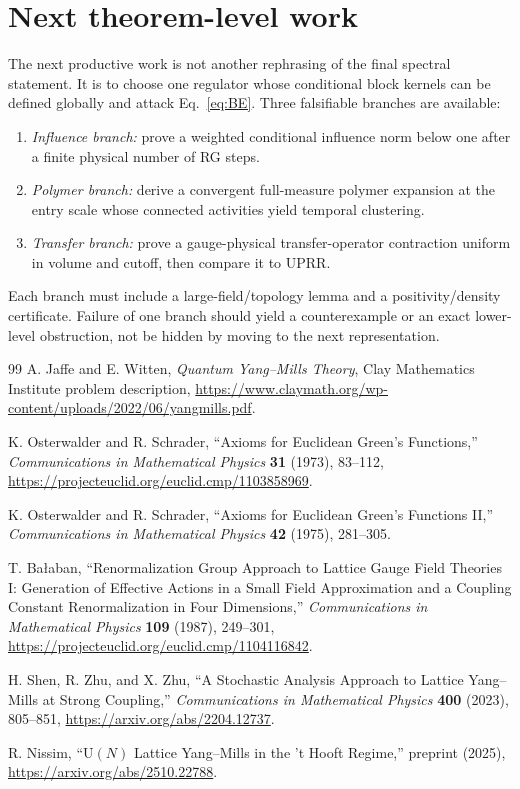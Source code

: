 \documentclass[11pt]{article}
\theoremstyle{remark}
\begin{document}
\section{Next theorem-level work}

The next productive work is not another rephrasing of the final spectral
statement.  It is to choose one regulator whose conditional block kernels can
be defined globally and attack Eq.~\eqref{eq:BE}.  Three falsifiable branches
are available:
\begin{enumerate}
\item \emph{Influence branch:} prove a weighted conditional influence norm
      below one after a finite physical number of RG steps.
\item \emph{Polymer branch:} derive a convergent full-measure polymer expansion
      at the entry scale whose connected activities yield temporal clustering.
\item \emph{Transfer branch:} prove a gauge-physical transfer-operator
      contraction uniform in volume and cutoff, then compare it to UPRR.
\end{enumerate}
Each branch must include a large-field/topology lemma and a positivity/density
certificate.  Failure of one branch should yield a counterexample or an exact
lower-level obstruction, not be hidden by moving to the next representation.

\begin{thebibliography}{99}
A. Jaffe and E. Witten,
\emph{Quantum Yang--Mills Theory}, Clay Mathematics Institute problem
description,\newline
\url{https://www.claymath.org/wp-content/uploads/2022/06/yangmills.pdf}.

K. Osterwalder and R. Schrader,
``Axioms for Euclidean Green's Functions,''
\emph{Communications in Mathematical Physics} \textbf{31} (1973), 83--112,\newline
\url{https://projecteuclid.org/euclid.cmp/1103858969}.

K. Osterwalder and R. Schrader,
``Axioms for Euclidean Green's Functions II,''
\emph{Communications in Mathematical Physics} \textbf{42} (1975), 281--305.

T. Ba\l aban,
``Renormalization Group Approach to Lattice Gauge Field Theories I:
Generation of Effective Actions in a Small Field Approximation and a Coupling
Constant Renormalization in Four Dimensions,''
\emph{Communications in Mathematical Physics} \textbf{109} (1987), 249--301,\newline
\url{https://projecteuclid.org/euclid.cmp/1104116842}.

H. Shen, R. Zhu, and X. Zhu,
``A Stochastic Analysis Approach to Lattice Yang--Mills at Strong Coupling,''
\emph{Communications in Mathematical Physics} \textbf{400} (2023), 805--851,\newline
\url{https://arxiv.org/abs/2204.12737}.

R. Nissim,
``$\mathrm{U}(N)$ Lattice Yang--Mills in the 't Hooft Regime,'' preprint
(2025),\newline
\url{https://arxiv.org/abs/2510.22788}.
\end{thebibliography}
\end{document}
